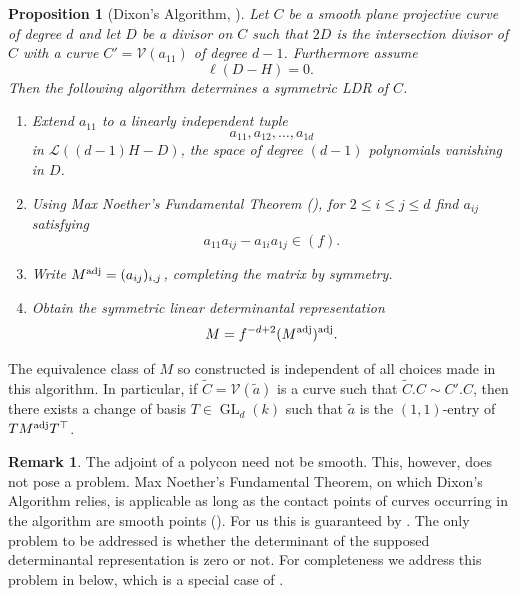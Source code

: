 \documentclass[a4paper,10pt]{amsart}
\theoremstyle{definition}
\newtheorem{rem}[defin]{Remark}
\theoremstyle{plain}
\newtheorem{prop}[defin]{Proposition}
\newcommand{\cL}{{\mathcal L}}
\newcommand{\cV}{{\mathcal V}}
\begin{document}
\begin{prop}[Dixon's Algorithm, {\cite[\S 4.1]{Dolgachev2012CAG}}] \label{prop: Dixon}
 Let $C$ be a smooth plane projective curve of degree $d$ and let $D$ be a divisor on $C$ such that $2D$ is the intersection divisor of $C$ with a curve $C' = \cV(a_{11})$ of degree $d-1$. Furthermore assume
 \begin{equation*}
     \ell(D-H) = 0.
 \end{equation*}
 Then the following algorithm determines a symmetric LDR of $C$.
 \begin{enumerate}
     \item Extend $a_{11}$ to a linearly independent tuple
     \begin{equation*}
         a_{11}, a_{12}, \dots, a_{1d}
     \end{equation*}
     in $\cL((d-1)H - D)$, the space of degree $(d-1)$ polynomials vanishing in $D$.
     
     \item Using Max Noether's Fundamental Theorem (\cite[\S 5.5]{Fulton2008Curves}), for $2 \leq i \leq j \leq d$ find $a_{ij}$ satisfying
     \begin{equation*}
        a_{11}a_{ij} - a_{1i}a_{1j} \in (f).
     \end{equation*}
     
     \item Write $M^{\textup{adj}} = (a_{ij})_{i,j}$, completing the matrix by symmetry.
     
     \item Obtain the symmetric linear determinantal representation
     \begin{equation*}
        M = f^{-d+2}(M^{\textup{adj}})^{\textup{adj}}.
    \end{equation*}
 \end{enumerate}
\end{prop}

The equivalence class of $M$ so constructed is independent of all choices made in this algorithm. In particular, if $\widetilde{C} = \cV(\widetilde{a})$ is a curve such that $\widetilde{C}.C \sim C'.C$, then there exists a change of basis $T \in \operatorname{GL}_d(k)$ such that $\widetilde{a}$ is the $(1,1)$-entry of $TM^{\textup{adj}}T^\top$.


\begin{rem}
 The adjoint of a polycon need not be smooth. This, however, does not pose a problem. Max Noether's Fundamental Theorem, on which Dixon's Algorithm relies, is applicable as long as the contact points of curves occurring in the algorithm are smooth points (\cite[\S 5.5, Proposition 1]{Fulton2008Curves}). For us this is guaranteed by . The only problem to be addressed is whether the determinant of the supposed determinantal representation is zero or not. For completeness we address this problem in  below, which is a special case of \cite[Proposition 5.4.]{KernerVinnikov2012singularDetRep}.
\end{rem}
\end{document}
